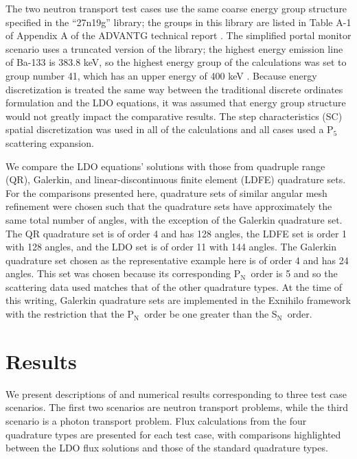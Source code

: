 \documentclass{article} %
\newcommand{\sn}{S$_\mathrm{N}$}
\newcommand{\pn}{P$_\mathrm{N}$}
\begin{document}
The two neutron transport test cases use the same coarse energy group structure
specified in  the ``27n19g'' library; the groups in this library are listed in 
Table A-1 of Appendix A of the ADVANTG technical report \cite{advantg}.
The simplified portal monitor scenario uses a truncated version of the library;
the highest energy emission line of Ba-133 is 383.8 keV, so the highest energy
group of the calculations was set to group number 41, which has an upper energy
of 400 keV \cite{advantg}. Because 
energy discretization is treated the same way between the traditional discrete
ordinates formulation and the LDO equations, it was assumed that energy group 
structure would not greatly impact the comparative results.
The step characteristics (SC) spatial discretization was used in all of the
calculations and all cases used a P$_5$ scattering expansion.

We compare the LDO equations' solutions with those from quadruple range (QR),
Galerkin, and linear-discontinuous finite element (LDFE) quadrature sets.
For the comparisons presented here, quadrature sets of similar angular mesh
refinement were chosen such that the quadrature sets have approximately the 
same total number of angles, with the exception of the Galerkin quadrature set.
The QR quadrature set is of order 4 and has 128 angles, the LDFE set is order 1
with 128 angles, and the LDO set is of order 11 with 144 angles. 
The Galerkin quadrature set chosen as the representative example here is of
order 4 and has 24 angles. This set was chosen because its corresponding \pn\
order is 5 and so the scattering data used matches that of the other quadrature
types. At the time of this writing, Galerkin quadrature sets are implemented in
the Exnihilo framework with the restriction that the \pn\ order be one greater
than the \sn\ order.

\section{Results}
\label{sec:results}

We present descriptions of and numerical results corresponding to three test
case scenarios. The first two scenarios are neutron transport problems, while
the third scenario is a photon transport problem. Flux calculations from the
four quadrature types are presented for each test case, with comparisons
highlighted between the LDO flux solutions and those of the standard
quadrature types.
\end{document}
